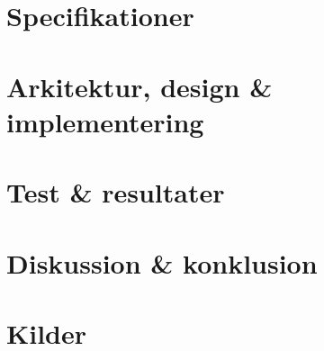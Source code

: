 
\usepackage{rotating}
\usepackage[utf8]{inputenc}
\usepackage[table,xcdraw,pdftex,dvipsnames]{xcolor}
\usepackage{graphicx}
\usepackage{placeins}
\TabPositions{4cm, 6cm, 8cm}




\frontmatter
\newpage




\cleardoublepage
\tableofcontents*
\listoftodos[Todo]
\mainmatter

\part{Specifikationer}



\part{Arkitektur, design \& implementering}



\part{ Test \& resultater}


\part{Diskussion \& konklusion}



\part{Kilder}


